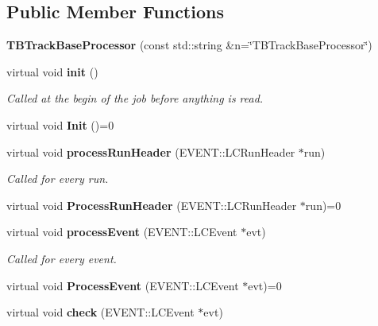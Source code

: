 \subsection*{Public Member Functions}
\begin{DoxyCompactItemize}
\item 
{\bfseries TBTrackBaseProcessor} (const std::string \&n=\char`\"{}TBTrackBaseProcessor\char`\"{})\label{classTBTrackBaseProcessor_a8e2072bc1fffd5cdf065b13e865733a0}

\item 
virtual void {\bf init} ()\label{classTBTrackBaseProcessor_a179b559dd67f1777b0622775918ae5f5}

\begin{DoxyCompactList}\small\item\em Called at the begin of the job before anything is read. \item\end{DoxyCompactList}\item 
virtual void {\bfseries Init} ()=0\label{classTBTrackBaseProcessor_a3efab6d4a570bdb0d0059105adef62fb}

\item 
virtual void {\bf processRunHeader} (EVENT::LCRunHeader $\ast$run)\label{classTBTrackBaseProcessor_a0fc18422f19b4c46ec4356df49b216c9}

\begin{DoxyCompactList}\small\item\em Called for every run. \item\end{DoxyCompactList}\item 
virtual void {\bfseries ProcessRunHeader} (EVENT::LCRunHeader $\ast$run)=0\label{classTBTrackBaseProcessor_a644859097b4910c8c6f8c8113bfee2c6}

\item 
virtual void {\bf processEvent} (EVENT::LCEvent $\ast$evt)\label{classTBTrackBaseProcessor_aba4e5b25679936687667e81f3a73df72}

\begin{DoxyCompactList}\small\item\em Called for every event. \item\end{DoxyCompactList}\item 
virtual void {\bfseries ProcessEvent} (EVENT::LCEvent $\ast$evt)=0\label{classTBTrackBaseProcessor_af0b02579767b903b46f9e220efcb83cc}

\item 
virtual void {\bf check} (EVENT::LCEvent $\ast$evt)\label{classTBTrackBaseProcessor_acdf5ee99137016fe8cc9681c0336fc85}


\end{DoxyCompactItemize}
